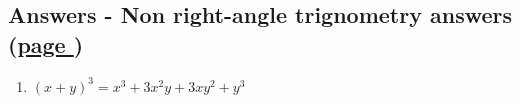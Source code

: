 \documentclass[../main.tex]{subfiles}
\begin{document}
\hypertarget{nonrighttriganswers}{\subsection*{Answers - Non right-angle trignometry answers (\hyperlink{nonrighttriglink}{page \pageref{Non right trig}})}}

\label{Non right trig answers}
\begin{enumerate}
    \item \( (x+y)^3 = x^3 + 3x^2 y + 3xy^2 +y^3 \)
    
\end{enumerate}
\end{document}
